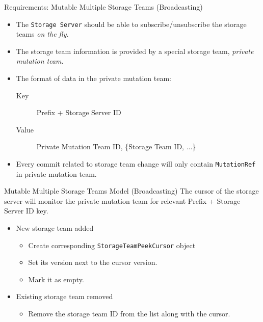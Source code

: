\documentclass[9pt]{beamer}
\begin{document}
    \begin{frame}{Requirements: Mutable Multiple Storage Teams (Broadcasting)}
        \begin{itemize}
            \item The \texttt{Storage Server} should be able to subscribe/unsubscribe the storage teams \emph{on the fly}.
            \item The storage team information is provided by a special storage team, \emph{private mutation team}.
            \item The format of data in the private mutation team:
            \begin{description}
                \item[Key] Prefix + Storage Server ID
                \item[Value] Private Mutation Team ID, \{Storage Team ID, ...\}
            \end{description}
            \item Every commit related to storage team change will only contain \texttt{MutationRef} in private mutation team.
        \end{itemize}
    \end{frame}
    
    \begin{frame}{Mutable Multiple Storage Teams Model (Broadcasting)}
        The cursor of the storage server will monitor the private mutation team for relevant Prefix + Storage Server ID key.
        \begin{itemize}
            \item New storage team added
            \begin{itemize}
                \item Create corresponding \texttt{StorageTeamPeekCursor} object
                \item Set its version next to the cursor version.
                \item Mark it as empty.
            \end{itemize}
            \item Existing storage team removed
            \begin{itemize}
                \item Remove the storage team ID from the list along with the cursor.
            \end{itemize}
        \end{itemize}
    \end{frame}
    
\end{document}
